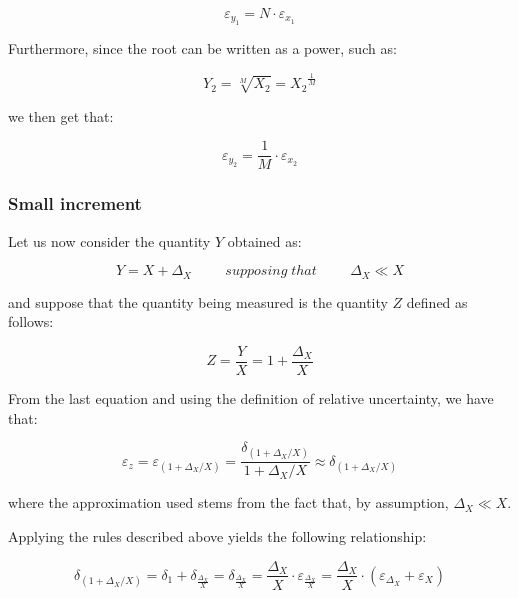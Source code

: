 \documentclass[../main.tex]{subfiles}
\begin{document}
\begin{equation}
	\varepsilon_{y_1} = N \cdot \varepsilon_{x_1}
\end{equation}


Furthermore, since the root can be written as a power, such as:

\begin{equation}
	Y_2 = \sqrt[M]{X_2} = {X_2}^{\frac{1}{M}}
\end{equation}

we then get that:

\begin{equation}
	\varepsilon_{y_2} = \frac{1}{M} \cdot \varepsilon_{x_2} 
\end{equation}

\subsubsection*{Small increment}

Let us now consider the quantity $Y$ obtained as:

\begin{equation}
	Y = X + \Delta_X \hspace{1cm} \unit{supposing\;that} \hspace{1cm} \Delta_X \ll X 
\end{equation}

and suppose that the quantity being measured is the quantity $Z$ defined as follows:

\begin{equation}
	Z = \frac{Y}{X} = 1 + \frac{\Delta_X}{X}	
\end{equation}

From the last equation and using the definition of relative uncertainty, we have that:

\begin{equation}
	\varepsilon_z = \varepsilon_{(1 + \Delta_X/X)} = \frac{\delta_{(1 + \Delta_X/X)}}{1 + \Delta_X/X} \approx \delta_{(1 + \Delta_X/X)} 
\end{equation}

where the approximation used stems from the fact that, by assumption, $\Delta_X \ll X$. 

Applying the rules described above yields the following relationship:

\begin{equation}
	\delta_{(1+\Delta_X / X)} = \delta_1 + \delta_{\frac{\Delta_X}{X}} = \delta_{\frac{\Delta_X}{X}} = \frac{\Delta_X}{X} \cdot \varepsilon_{\frac{\Delta_X}{X}} = \frac{\Delta_X}{X} \cdot (\varepsilon_{\Delta_X} + \varepsilon_X) 
\end{equation}
\end{document}

